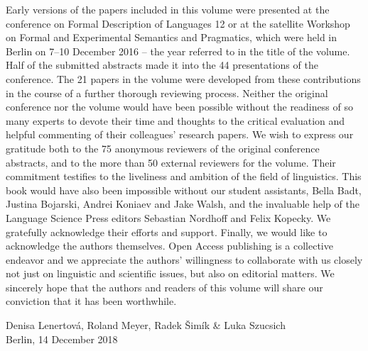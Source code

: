 \begin{refsection}
Early versions of the papers included in this volume were presented at the conference on Formal Description of  Languages 12 or at the satellite Workshop on Formal and Experimental Semantics and Pragmatics, which were held in Berlin on 7--10 December 2016 -- the year referred to in the title of the volume. Half of the submitted abstracts made it into the 44 presentations of the conference. The 21 papers in the  volume were developed from these contributions in the course of a further thorough reviewing process. Neither the original conference nor the  volume would have been possible without the readiness of so many experts to devote their time and thoughts to the critical evaluation and helpful commenting of their colleagues' research papers. We wish to express our gratitude both to the 75 anonymous reviewers of the original conference abstracts, and to the more than 50 external reviewers for the  volume. Their commitment testifies to the liveliness and ambition of the field of  linguistics. This book would have also been impossible without our student assistants, Bella Badt, Justina Bojarski, Andrei Koniaev and Jake Walsh, and the invaluable help of the Language Science Press editors Sebastian Nordhoff and Felix Kopecky. We gratefully acknowledge their efforts and support. Finally, we would like to acknowledge the authors themselves. Open Access publishing is a collective endeavor and we appreciate the authors' willingness to collaborate with us closely not just on linguistic and scientific issues, but also on editorial matters. We sincerely hope that the authors and readers of this volume will share our conviction that it has been worthwhile.

\null\hfill Denisa Lenertová, Roland Meyer, Radek Šimík \& Luka Szucsich\\
\null\hfill Berlin, 14 December 2018
\end{refsection}

